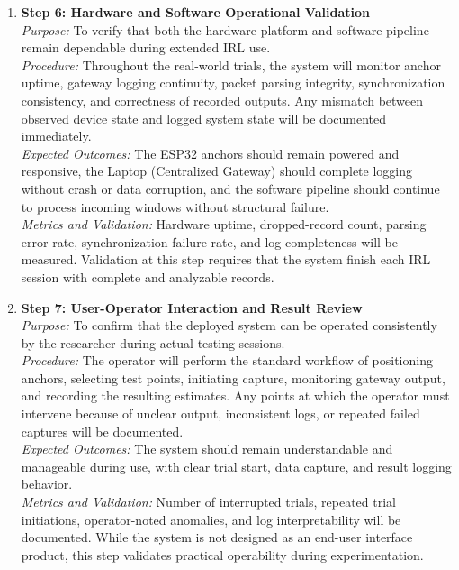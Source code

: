 \begin{enumerate}
    \item \textbf{Step 6: Hardware and Software Operational Validation} \\
    \textit{Purpose:} To verify that both the hardware platform and software pipeline remain dependable during extended IRL use. \\
    \textit{Procedure:} Throughout the real-world trials, the system will monitor anchor uptime, gateway logging continuity, packet parsing integrity, synchronization consistency, and correctness of recorded outputs. Any mismatch between observed device state and logged system state will be documented immediately. \\
    \textit{Expected Outcomes:} The ESP32 anchors should remain powered and responsive, the Laptop (Centralized Gateway) should complete logging without crash or data corruption, and the software pipeline should continue to process incoming windows without structural failure. \\
    \textit{Metrics and Validation:} Hardware uptime, dropped-record count, parsing error rate, synchronization failure rate, and log completeness will be measured. Validation at this step requires that the system finish each IRL session with complete and analyzable records.

    \item \textbf{Step 7: User-Operator Interaction and Result Review} \\
    \textit{Purpose:} To confirm that the deployed system can be operated consistently by the researcher during actual testing sessions. \\
    \textit{Procedure:} The operator will perform the standard workflow of positioning anchors, selecting test points, initiating capture, monitoring gateway output, and recording the resulting estimates. Any points at which the operator must intervene because of unclear output, inconsistent logs, or repeated failed captures will be documented. \\
    \textit{Expected Outcomes:} The system should remain understandable and manageable during use, with clear trial start, data capture, and result logging behavior. \\
    \textit{Metrics and Validation:} Number of interrupted trials, repeated trial initiations, operator-noted anomalies, and log interpretability will be documented. While the system is not designed as an end-user interface product, this step validates practical operability during experimentation.


\end{enumerate}
